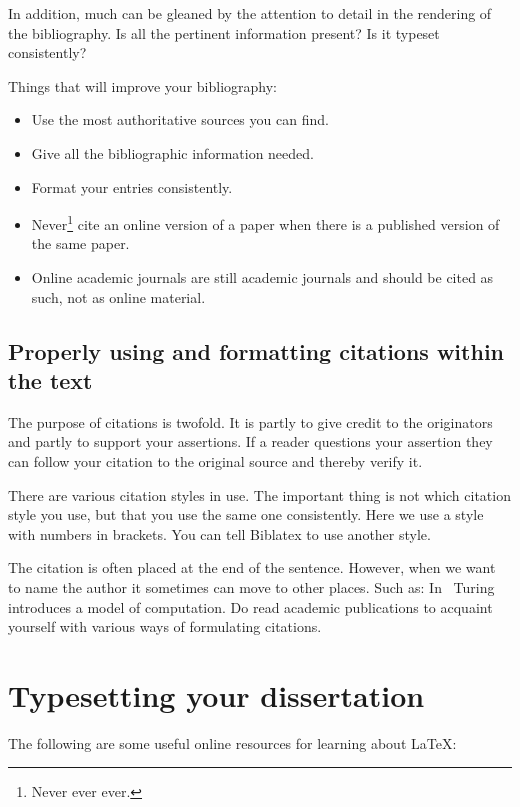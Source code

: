 \documentclass[12pt]{article}
\theoremstyle{plain}
\theoremstyle{definition}
\begin{document}
In addition, much can be gleaned by the attention to detail in the
rendering of the bibliography. Is all the pertinent information
present? Is it typeset consistently?

Things that will improve your bibliography:
\begin{itemize}
\item Use the most authoritative sources you can find.
\item Give all the bibliographic information needed.
\item Format your entries consistently.
\item Never\footnote{Never ever ever.} cite an online version of
  a paper when there is a published version of the same paper.
\item Online academic journals are still academic journals and should
  be cited as such, not as online material.
\end{itemize}

\subsection{Properly using and formatting citations within the text}

The purpose of citations is twofold. It is partly to give credit to
the originators and partly to support your assertions. If a reader
questions your assertion they can follow your citation to the original
source and thereby verify it.

There are various citation styles in use. The important thing is not
which citation style you use, but that you use the same one
consistently. Here we use a style with numbers in brackets. You can
tell Biblatex to use another style.

The citation is often placed at the end of the sentence. However, when
we want to name the author it sometimes can move to other places. Such
as: In~\cite{turing36} Turing introduces a model of computation. Do
read academic publications to acquaint yourself with various ways of
formulating citations.

\section{Typesetting your dissertation}
\label{sec:typesetting}

The following are some useful online resources for learning about
LaTeX:
\end{document}

